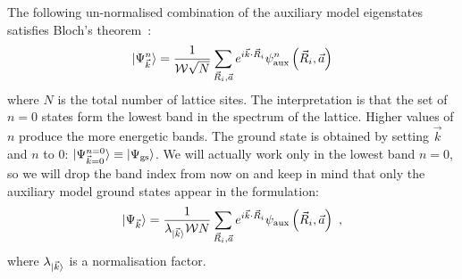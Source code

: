 \documentclass{report}
\numberwithin{equation}{section}
\begin{document}
The following un-normalised combination of the auxiliary model eigenstates satisfies Bloch's theorem~\cite{stoyanova}:
\begin{equation}\begin{aligned}
	\ket{\Psi^n_{\vec k}} = \frac{1}{\mathcal{W} \sqrt N}\sum_{\vec R_i, \vec a} e^{i \vec{k}\cdot\vec{R}_i} \psi^n_\text{aux}\left(\vec R_i, \vec a\right)
\end{aligned}\end{equation}
where \(N\) is the total number of lattice sites. The interpretation is that the set of \(n=0\) states form the lowest band in the spectrum of the lattice. Higher values of \(n\) produce the more energetic bands. The ground state is obtained by setting \(\vec k\) and \(n\) to 0: \(\ket{\Psi_{\vec k=0}^{n=0}} \equiv \ket{\Psi_\text{gs}}\). We will actually work only in the lowest band \(n=0\), so we will drop the band index from now on and keep in mind that only the auxiliary model ground states appear in the formulation:
\begin{equation}\begin{aligned}
	\label{bloch-states}
	\ket{\Psi_{\vec k}} = \frac{1}{\lambda_{\ket{\vec k}} \mathcal{W} N}\sum_{\vec R_i, \vec a} e^{i \vec{k}\cdot\vec{R}_i} \psi_\text{aux}\left(\vec R_i, \vec a\right)~,
\end{aligned}\end{equation}
where \(\lambda_{\ket{\vec k}}\) is a normalisation factor. 
\end{document}
